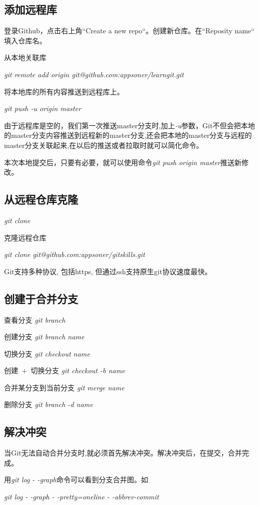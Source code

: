 \documentclass[UTF8]{ctexart}
\begin{document}
\subsection{添加远程库}

\textbullet 登录Github，点击右上角“Create a new repo“。创建新仓库。在“Reposity name“ 填入仓库名。

\textbullet 从本地关联库

\textit{git remote add origin git@github.com:appsoner/learngit.git}

\textbullet 将本地库的所有内容推送到远程库上。

\textit{git push -u origin master}

由于远程库是空的，我们第一次推送master分支时,加上\textit{-u}参数，Git不但会把本地的master分支内容推送到远程新的master分支,还会把本地的master分支与远程的master分支关联起来,在以后的推送或者拉取时就可以简化命令。

\textbullet 本次本地提交后，只要有必要，就可以使用命令\textit{git push origin master}推送新修改。
\subsection{从远程仓库克隆}
\textit{git clone}

\textbullet 克隆远程仓库

\textit{git clone git@github.com:appsoner/gitskills.git}

\textbullet Git支持多种协议, 包括https, 但通过ssh支持原生git协议速度最快。
\subsection{创建于合并分支}

查看分支 \textit{git branch}

创建分支 \textit{git branch name}

切换分支 \textit{git checkout name}

创建~$+$~切换分支 \textit{git checkout -b name}

合并某分支到当前分支 \textit{git merge name}

删除分支 \textit{git branch -d name}
\subsection{解决冲突}
当Git无法自动合并分支时,就必须首先解决冲突。解决冲突后，在提交，合并完成。

用\textit{git log - -graph}命令可以看到分支合并图。如

\textit{git log - -graph - -pretty=oneline - -abbrev-commit	}
\end{document}
